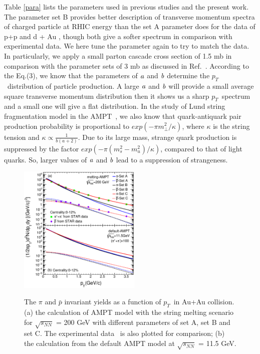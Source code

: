 \documentclass[twocolumn,aps,prc,showpacs,superscriptaddress,preprintnumbers,floatfix,nofootinbib]{revtex4}
\newcommand{ \pt } {${p_{T}}$}
\begin{document}
\begin{CJK*}{GBK}{song}
Table \ref{para} lists the parameters used in previous studies and the present work. The parameter set B provides better description of transverse momentum spectra of charged particle at RHIC energy than the set A parameter does   for the data of p+p and d + Au \cite{dAu}, though both give a softer spectrum in comparison with experimental data. We here tune the parameter again to try to match the data. In particularly, we apply a small parton cascade cross section of 1.5 mb in comparison with the parameter sets of 3 mb as discussed in Ref.~\cite{ablin2}. According to the Eq.(3), we know that the parameters of $\it a$ and $\it b$ determine the \pt ~distribution of particle production. A large $\it a$ and $\it b$ will provide a small average square transverse momentum distribution then it shows us a sharp \pt ~spectrum and a small one will give a flat distribution. In the study of Lund string fragmentation model in the AMPT~\cite{AMPT-model-a}, we also know that quark-antiquark pair production probability is proportional to $exp(-\pi m_{\perp }^{2}/\kappa )$, where $\kappa$ is the string tension and $\kappa\propto \frac{1}{b(a+2)}$. Due to its large mass, strange quark production is suppressed by the factor $exp(-\pi (m_{s}^{2}-m_{u}^{2})/\kappa )$, compared to that of light quarks. So, larger values of $\it a$ and $\it b$ lead to a suppression of strangeness.

    \begin{figure}[htbp]
      \includegraphics[width=0.52\textwidth]{Fig1_compare.eps}\\
      \caption{The $\pi$ and $\bar{p}$ invariant yields as a function of \pt~in Au+Au collision. (a)  the calculation of AMPT model with the string melting scenario for  $\sqrt{s_{NN}}$ = 200 GeV with different parameters of set A, set B and set C. The experimental data~\cite{star_compare} is also plotted for comparison; (b) the calculation from the default AMPT model at $\sqrt{s_{NN}}$ = 11.5 GeV.}
      \label{compare}
    \end{figure}


\end{CJK*}
\end{document}
